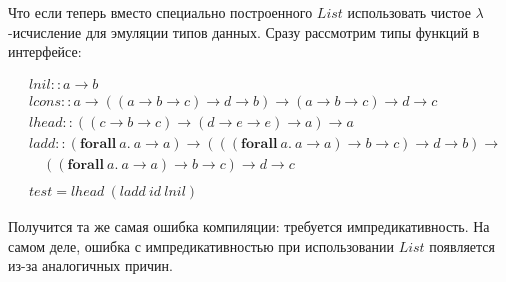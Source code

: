 Что если теперь вместо специально построенного \(List\) использовать чистое
\(\lambda\)-исчисление для эмуляции типов данных. Сразу рассмотрим типы функций
в интерфейсе:

\begin{align*}
&lnil :: a \rightarrow b\\
&lcons :: a \rightarrow ((a \rightarrow b \rightarrow c) \rightarrow d \rightarrow b)
   \rightarrow (a \rightarrow b \rightarrow c) \rightarrow d \rightarrow c\\
&lhead :: ((c \rightarrow b \rightarrow c) \rightarrow (d \rightarrow e \rightarrow e)
   \rightarrow a) \rightarrow a\\
&ladd :: (\mathbf{forall}\ a.\ a \rightarrow a) \rightarrow
   (((\mathbf{forall}\ a.\ a \rightarrow a) \rightarrow b \rightarrow c)
   \rightarrow d \rightarrow b) \rightarrow \\
&\quad((\mathbf{forall}\ a.\ a \rightarrow a) \rightarrow b \rightarrow c)
   \rightarrow d \rightarrow c\\
\\
&test = lhead\ (ladd\ id\ lnil)
\end{align*}

Получится та же самая ошибка компиляции: требуется импредикативность. На самом деле,
ошибка с импредикативностью при использовании \(List\) появляется из-за аналогичных причин.
